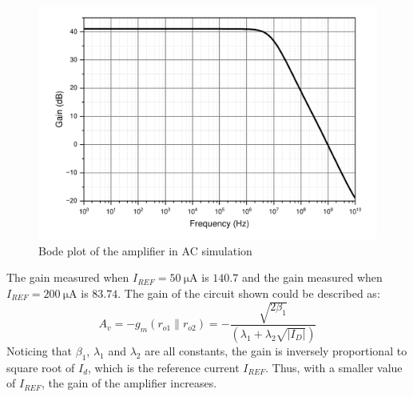 \documentclass[12pt]{article}   %
\begin{document}
	\begin{figure}[htbp]
		\centering
		\includegraphics[width=0.7\linewidth]{Figures/E3_Current_Mirror/mixed_amp_ac}
		\caption{Bode plot of the amplifier in AC simulation}
		\label{fig:mixedAmpAc}
	\end{figure}
	
	The gain measured when $I_{REF} = \SI{50}{\micro\ampere}$ is $140.7$ and the gain measured when $I_{REF} = \SI{200}{\micro\ampere}$ is $83.74$. The gain of the circuit shown could be described as\cite{razaviDesignAnalogCMOS2017}:
	\begin{equation}
		A_v = - g_m \left(r_{o1} \parallel r_{o2}\right) = - \frac{\sqrt{2\beta_1}}{\left(\lambda_1 + \lambda_2 \sqrt{\left|I_{D}\right|}\right)}
	\end{equation}
	Noticing that $\beta_1$, $\lambda_1$ and $\lambda_2$ are all constants, the gain is inversely proportional to square root of $I_d$, which is the reference current $I_{REF}$. Thus, with a smaller value of $I_{REF}$, the gain of the amplifier increases.
	
	\newpage
	
	
	
	
\end{document}
